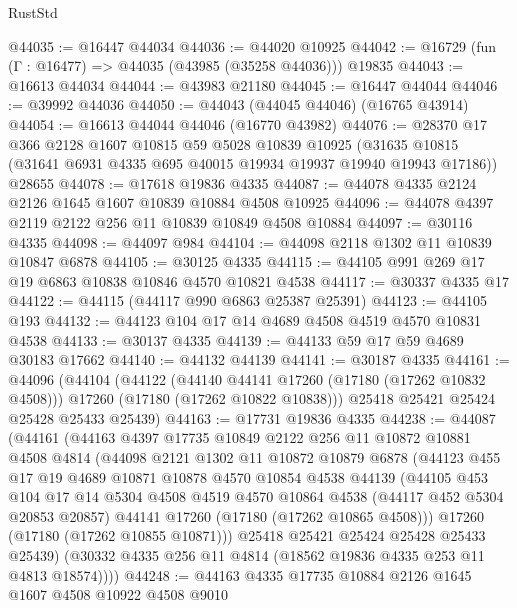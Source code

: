 \begin{lexlean}{RustStd}
\begin{coremodule}
{\begin{coremodule}
{{{{{{{{{{{{{{{{{{{{{{{{{{{{{{{{{{{{{{{{{{{{{{{{{{{{{{{@44035 := @16447 @44034
@44036 := @44020 @10925
@44042 := @16729 (fun (Γ : @16477) => @44035 (@43985 (@35258 @44036))) @19835
@44043 := @16613 @44034
@44044 := @43983 @21180
@44045 := @16447 @44044
@44046 := @39992 @44036
@44050 := @44043 (@44045 @44046) (@16765 @43914)
@44054 := @16613 @44044 @44046 (@16770 @43982)
@44076 := @28370
    @17
    @366
    @2128
    @1607
    @10815
    @59
    @5028
    @10839
    @10925
    (@31635 @10815 (@31641 @6931 @4335 @695 @40015 @19934 @19937 @19940 @19943 @17186))
    @28655
@44078 := @17618 @19836 @4335
@44087 := @44078 @4335 @2124 @2126 @1645 @1607 @10839 @10884 @4508 @10925
@44096 := @44078 @4397 @2119 @2122 @256 @11 @10839 @10849 @4508 @10884
@44097 := @30116 @4335
@44098 := @44097 @984
@44104 := @44098 @2118 @1302 @11 @10839 @10847 @6878
@44105 := @30125 @4335
@44115 := @44105 @991 @269 @17 @19 @6863 @10838 @10846 @4570 @10821 @4538
@44117 := @30337 @4335 @17
@44122 := @44115 (@44117 @990 @6863 @25387 @25391)
@44123 := @44105 @193
@44132 := @44123 @104 @17 @14 @4689 @4508 @4519 @4570 @10831 @4538
@44133 := @30137 @4335
@44139 := @44133 @59 @17 @59 @4689 @30183 @17662
@44140 := @44132 @44139
@44141 := @30187 @4335
@44161 := @44096
    (@44104
      (@44122
        (@44140 @44141 @17260 (@17180 (@17262 @10832 @4508)))
        @17260
        (@17180 (@17262 @10822 @10838)))
      @25418
      @25421
      @25424
      @25428
      @25433
      @25439)
@44163 := @17731 @19836 @4335
@44238 := @44087
    (@44161
      (@44163
        @4397
        @17735
        @10849
        @2122
        @256
        @11
        @10872
        @10881
        @4508
        @4814
        (@44098
          @2121
          @1302
          @11
          @10872
          @10879
          @6878
          (@44123
            @455
            @17
            @19
            @4689
            @10871
            @10878
            @4570
            @10854
            @4538
            @44139
            (@44105
              @453
              @104
              @17
              @14
              @5304
              @4508
              @4519
              @4570
              @10864
              @4538
              (@44117 @452 @5304 @20853 @20857)
              @44141
              @17260
              (@17180 (@17262 @10865 @4508)))
            @17260
            (@17180 (@17262 @10855 @10871)))
          @25418
          @25421
          @25424
          @25428
          @25433
          @25439)
        (@30332 @4335 @256 @11 @4814 (@18562 @19836 @4335 @253 @11 @4813 @18574))))
@44248 := @44163 @4335 @17735 @10884 @2126 @1645 @1607 @4508 @10922 @4508 @9010
}}}}}}}}}}}}}}}}}}}}}}}}}}}}}}}}}}}}}}}}}}}}}}}}}}}}}}}
\end{coremodule}}
\end{coremodule}
\end{lexlean}
